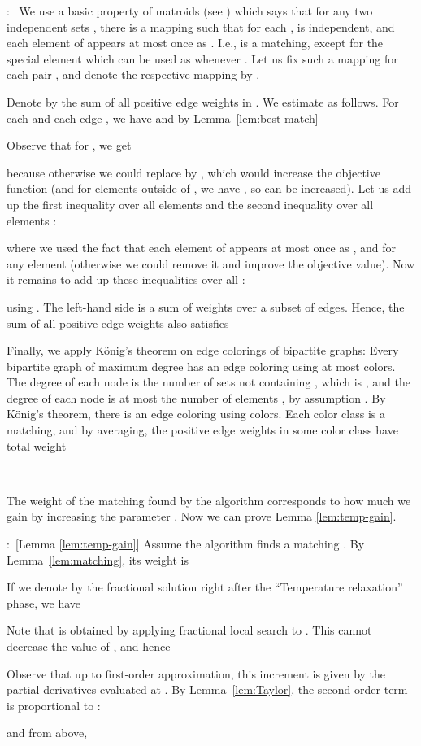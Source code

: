 \documentclass{article}[11pt]
\renewenvironment{proof}{\noindent{\bf Proof}:~}{\\}
\begin{document}
\begin{proof}
We use a basic property of matroids (see \cite{Schrijver}) which says
that for any two independent sets , there is a
mapping  such that
for each ,  is independent,
and each element of  appears at most once as .
I.e.,  is a matching, except for the special element  which can be used
as  whenever .
Let us fix such a mapping for each pair , and denote the respective
mapping by .

Denote by  the sum of all positive edge weights in . We estimate
 as follows. For each  and each edge , we have
 and by Lemma~\ref{lem:best-match}

Observe that for , we get

because otherwise we could replace  by ,
which would increase the objective function (and for elements outside of ,
we have , so  can be increased).
Let us add up the first inequality over all elements 
and the second inequality over all elements :

where we used the fact that each element of 
appears at most once as , and 
for any element  (otherwise we could remove it
and improve the objective value).
Now it remains to add up these inequalities over all :

using .
The left-hand side is a sum of weights over a subset of edges.
Hence, the sum of all positive edge weights also satisfies

Finally, we apply K\"{o}nig's theorem on edge colorings of bipartite graphs:
Every bipartite graph of maximum degree  has an edge coloring using
at most  colors.
The degree of each node  is the number of sets  not containing ,
which is , and the degree of each node  is at most the number
of elements , by assumption . By K\"{o}nig's theorem,
there is an edge coloring using  colors. Each color class is a matching,
and by averaging, the positive edge weights in some color class have total weight

\end{proof}


The weight of the matching found by the algorithm corresponds to how
much we gain by increasing the parameter . Now we can prove Lemma \ref{lem:temp-gain}.

\medskip


\begin{proof}[Lemma \ref{lem:temp-gain}]
Assume the algorithm finds a matching . By Lemma~\ref{lem:matching},
its weight is

If we denote by  the fractional solution right after the ``Temperature relaxation'' phase, we have

Note that  is obtained by applying fractional local search to .
This cannot decrease the value of , and hence

Observe that up to first-order approximation, this increment is given by the
partial derivatives evaluated at . 
By Lemma~\ref{lem:Taylor}, the second-order term is proportional to :

and from above,

\end{proof}
\end{document}
